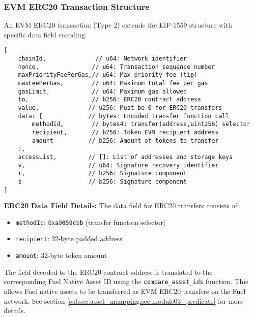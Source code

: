 \subsubsection{EVM ERC20 Transaction Structure}
An EVM ERC20 transaction (Type 2) extends the EIP-1559 structure with specific data field encoding:
\begin{lstlisting}
[
    chainId,              // u64: Network identifier
    nonce,               // u64: Transaction sequence number
    maxPriorityFeePerGas,// u64: Max priority fee (tip)
    maxFeePerGas,        // u64: Maximum total fee per gas
    gasLimit,            // u64: Maximum gas allowed
    to,                  // b256: ERC20 contract address
    value,              // u256: Must be 0 for ERC20 transfers
    data: [             // bytes: Encoded transfer function call
        methodId,        // bytes4: transfer(address,uint256) selector
        recipient,       // b256: Token EVM recipient address
        amount          // b256: Amount of tokens to transfer
    ],
    accessList,         // []: List of addresses and storage keys
    v,                  // u64: Signature recovery identifier
    r,                  // b256: Signature component
    s                   // b256: Signature component
]
\end{lstlisting}

\textbf{ERC20 Data Field Details:}
The data field for ERC20 transfers consists of:
\begin{itemize}
    \item \texttt{methodId}: \texttt{0xa9059cbb} (transfer function selector)
    \item \texttt{recipient}: 32-byte padded address
    \item \texttt{amount}: 32-byte token amount
\end{itemize}

The field decoded to the ERC20 contract address is translated to the corresponding Fuel Native Asset ID
using the \texttt{compare\_asset\_ids} function. This allows Fuel native assets to be transferred as EVM ERC20 transfers
on the Fuel network. See section \ref{subsec:asset_maapping:sec:module03_predicate} for more details.





